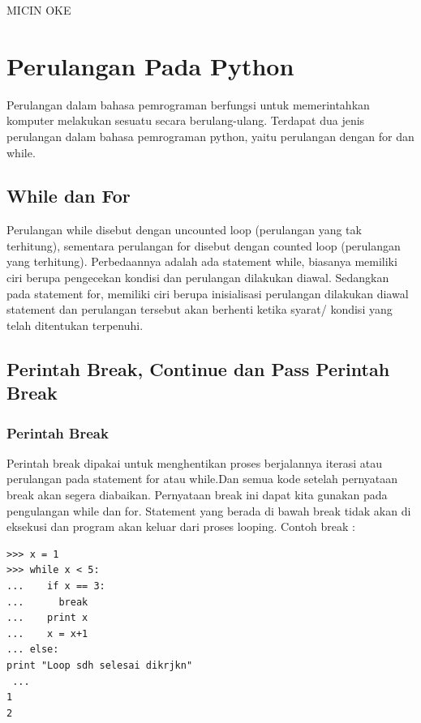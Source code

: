 
MICIN OKE

\section{Perulangan Pada Python}
Perulangan dalam bahasa pemrograman berfungsi untuk memerintahkan komputer melakukan sesuatu secara berulang-ulang. Terdapat dua jenis perulangan dalam bahasa pemrograman python, yaitu perulangan dengan for dan while.
\subsection{While dan For}
Perulangan while disebut dengan uncounted loop (perulangan yang tak terhitung), sementara perulangan for disebut dengan counted loop (perulangan yang terhitung). Perbedaannya adalah ada statement while, biasanya memiliki ciri berupa pengecekan kondisi dan perulangan dilakukan diawal. Sedangkan pada statement for, memiliki ciri berupa inisialisasi perulangan dilakukan diawal statement dan perulangan tersebut akan berhenti ketika syarat/ kondisi yang telah ditentukan terpenuhi\cite{santoso2009bahasa}.

\subsection{Perintah Break, Continue dan Pass Perintah Break}
\subsubsection{Perintah Break}
Perintah break dipakai untuk menghentikan proses berjalannya iterasi atau perulangan pada statement for atau while\cite{arfian2012rekayasa}.Dan semua kode setelah pernyataan break akan segera diabaikan. Pernyataan break ini dapat kita gunakan pada pengulangan while dan for.
Statement yang berada di bawah break tidak akan di eksekusi dan program akan keluar dari proses looping.  
Contoh break : 
\begin{verbatim}
>>> x = 1     
>>> while x < 5:     
...    if x == 3:     
...      break     
...    print x     
...    x = x+1                                                                                                                    
... else:          
print "Loop sdh selesai dikrjkn"   
 ...     
1    
2 
\end{verbatim}

